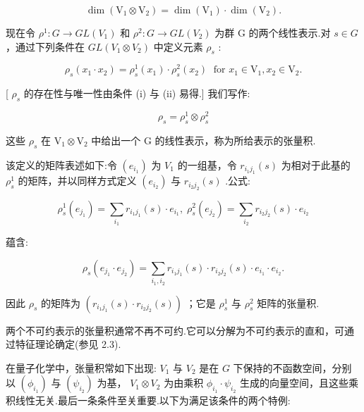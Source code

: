 \[
\dim \left( {{\mathrm{V}}_{1} \otimes  {\mathrm{V}}_{2}}\right)  = \dim \left( {\mathrm{V}}_{1}\right)  \cdot  \dim \left( {\mathrm{V}}_{2}\right) .
\]

现在令 \({\rho }^{1} : G \rightarrow  {GL}\left( {V}_{1}\right)\) 和 \({\rho }^{2} : G \rightarrow  {GL}\left( {V}_{2}\right)\) 为群 G 的两个线性表示.对 \(s \in  G\) ，通过下列条件在 \({GL}\left( {{V}_{1} \otimes  {V}_{2}}\right)\) 中定义元素 \({\rho }_{s}\) :

\[
{\rho }_{s}\left( {{x}_{1} \cdot  {x}_{2}}\right)  = {\rho }_{s}^{1}\left( {x}_{1}\right)  \cdot  {\rho }_{s}^{2}\left( {x}_{2}\right) \;\text{ for }{x}_{1} \in  {\mathrm{V}}_{1},{x}_{2} \in  {\mathrm{V}}_{2}.
\]

[ \({\rho }_{s}\) 的存在性与唯一性由条件 (i) 与 (ii) 易得.] 我们写作:

\[
{\rho }_{s} = {\rho }_{s}^{1} \otimes  {\rho }_{s}^{2}
\]

这些 \({\rho }_{s}\) 在 \({\mathrm{V}}_{1} \otimes  {\mathrm{V}}_{2}\) 中给出一个 \(\mathrm{G}\) 的线性表示，称为所给表示的张量积.

该定义的矩阵表述如下:令 \(\left( {e}_{{i}_{1}}\right)\) 为 \({V}_{1}\) 的一组基，令 \({r}_{{i}_{1}{j}_{1}}\left( s\right)\) 为相对于此基的 \({\rho }_{s}^{1}\) 的矩阵，并以同样方式定义 \(\left( {e}_{{i}_{2}}\right)\) 与 \({r}_{{i}_{2}{j}_{2}}\left( s\right)\) .公式:

\[
{\rho }_{s}^{1}\left( {e}_{{j}_{1}}\right)  = \mathop{\sum }\limits_{{i}_{1}}{r}_{{i}_{1}{j}_{1}}\left( s\right)  \cdot  {e}_{{i}_{1}},\;{\rho }_{s}^{2}\left( {e}_{{j}_{2}}\right)  = \mathop{\sum }\limits_{{i}_{2}}{r}_{{i}_{2}{j}_{2}}\left( s\right)  \cdot  {e}_{{i}_{2}}
\]

蕴含:

\[
{\rho }_{s}\left( {{e}_{{j}_{1}} \cdot  {e}_{{j}_{2}}}\right)  = \mathop{\sum }\limits_{{{i}_{1},{i}_{2}}}{r}_{{i}_{1}{j}_{1}}\left( s\right)  \cdot  {r}_{{i}_{2}{j}_{2}}\left( s\right)  \cdot  {e}_{{i}_{1}} \cdot  {e}_{{i}_{2}}.
\]

因此 \({\rho }_{s}\) 的矩阵为 \(\left( {{r}_{{i}_{1}{j}_{1}}\left( s\right)  \cdot  {r}_{{i}_{2}{j}_{2}}\left( s\right) }\right)\) ；它是 \({\rho }_{s}^{1}\) 与 \({\rho }_{s}^{2}\) 矩阵的张量积.

两个不可约表示的张量积通常不再不可约.它可以分解为不可约表示的直和，可通过特征理论确定(参见 2.3).

在量子化学中，张量积常如下出现: \({V}_{1}\) 与 \({V}_{2}\) 是在 \(G\) 下保持的不函数空间，分别以 \(\left( {\phi }_{{i}_{1}}\right)\) 与 \(\left( {\psi }_{{i}_{2}}\right)\) 为基， \({V}_{1} \otimes  {V}_{2}\) 为由乘积 \({\phi }_{{i}_{1}} \cdot  {\psi }_{{i}_{2}}\) 生成的向量空间，且这些乘积线性无关.最后一条条件至关重要.以下为满足该条件的两个特例:

